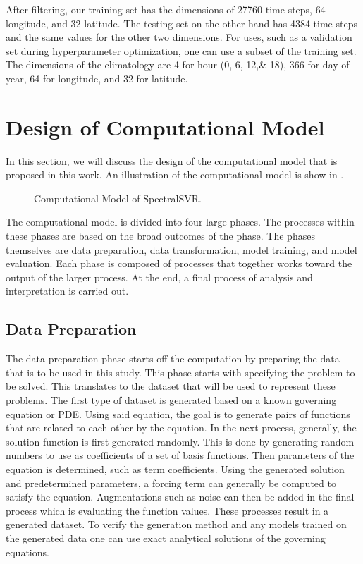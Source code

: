 After filtering, our training set has the dimensions of 27760 time steps, 64 longitude, and 32 latitude. The testing set on the other hand has 4384 time steps and the same values for the other two dimensions. For uses, such as a validation set during hyperparameter optimization, one can use a subset of the training set. The dimensions of the climatology are 4 for hour (0, 6, 12,\& 18), 366 for day of year, 64 for longitude, and 32 for latitude.

\section{Design of Computational Model}\label{sec:computational_model_design}
\noindent In this section, we will discuss the design of the computational model that is proposed in this work. An illustration of the computational model is show in .

\begin{figure}[H]
  \centering
  \begin{adjustbox}{max width=\textwidth}
  \end{adjustbox}
  \caption{Computational Model of SpectralSVR.}\label{fig:computational_model}
\end{figure}

The computational model is divided into four large phases. The processes within these phases are based on the broad outcomes of the phase. The phases themselves are data preparation, data transformation, model training, and model evaluation. Each phase is composed of processes that together works toward the output of the larger process. At the end, a final process of analysis and interpretation is carried out.

\subsection{Data Preparation}
\noindent The data preparation phase starts off the computation by preparing the data that is to be used in this study. This phase starts with specifying the problem to be solved. This translates to the dataset that will be used to represent these problems. The first type of dataset is generated based on a known governing equation or PDE\@. Using said equation, the goal is to generate pairs of functions that are related to each other by the equation. In the next process, generally, the solution function is first generated randomly. This is done by generating random numbers to use as coefficients of a set of basis functions. Then parameters of the equation is determined, such as term coefficients. Using the generated solution and predetermined parameters, a forcing term can generally be computed to satisfy the equation. Augmentations such as noise can then be added in the final process which is evaluating the function values. These processes result in a generated dataset. To verify the generation method and any models trained on the generated data one can use exact analytical solutions of the governing equations.

